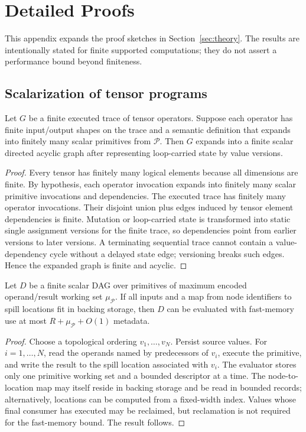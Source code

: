 \section{Detailed Proofs}
\label{app:proofs}

This appendix expands the proof sketches in Section~\ref{sec:theory}. The results are intentionally stated for finite supported computations; they do not assert a performance bound beyond finiteness.

\subsection{Scalarization of tensor programs}

\begin{lemma}
\label{lem:scalarization}
Let $G$ be a finite executed trace of tensor operators. Suppose each operator has finite input/output shapes on the trace and a semantic definition that expands into finitely many scalar primitives from $\mathcal P$. Then $G$ expands into a finite scalar directed acyclic graph after representing loop-carried state by value versions.
\end{lemma}

\begin{proof}
Every tensor has finitely many logical elements because all dimensions are finite. By hypothesis, each operator invocation expands into finitely many scalar primitive invocations and dependencies. The executed trace has finitely many operator invocations. Their disjoint union plus edges induced by tensor element dependencies is finite. Mutation or loop-carried state is transformed into static single assignment versions for the finite trace, so dependencies point from earlier versions to later versions. A terminating sequential trace cannot contain a value-dependency cycle without a delayed state edge; versioning breaks such edges. Hence the expanded graph is finite and acyclic.
\end{proof}

\begin{lemma}
\label{lem:scalar-evaluator}
Let $D$ be a finite scalar DAG over primitives of maximum encoded operand/result working set $\mu_{\mathcal P}$. If all inputs and a map from node identifiers to spill locations fit in backing storage, then $D$ can be evaluated with fast-memory use at most $R+\mu_{\mathcal P}+O(1)$ metadata.
\end{lemma}

\begin{proof}
Choose a topological ordering $v_1,\ldots,v_N$. Persist source values. For $i=1,
\ldots,N$, read the operands named by predecessors of $v_i$, execute the primitive, and write the result to the spill location associated with $v_i$. The evaluator stores only one primitive working set and a bounded descriptor at a time. The node-to-location map may itself reside in backing storage and be read in bounded records; alternatively, locations can be computed from a fixed-width index. Values whose final consumer has executed may be reclaimed, but reclamation is not required for the fast-memory bound. The result follows.
\end{proof}

